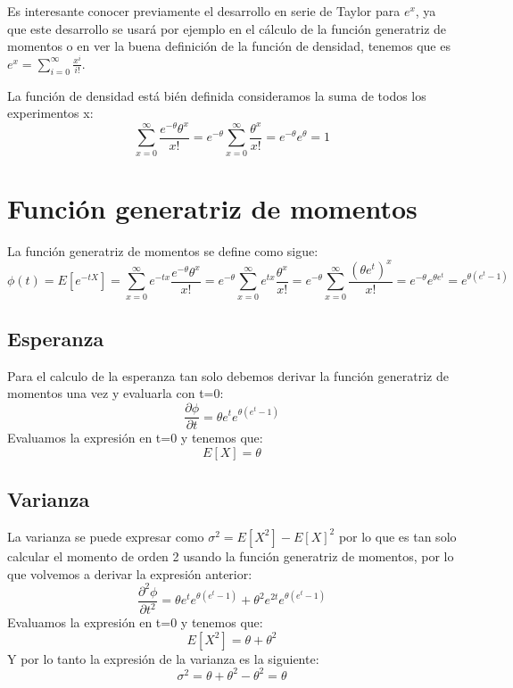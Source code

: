 \documentclass[a4paper, 10pt]{article} %
\newcounter{def}
\begin{document}
Es interesante conocer previamente el desarrollo en serie de Taylor para $e^x$, ya que este desarrollo se usará por ejemplo en el cálculo de la función generatriz de momentos o en ver la buena definición de la función de densidad, tenemos que es $e^x=\sum_{i=0}^{\infty}\frac{x^i}{i!}$.

La función de densidad está bién definida consideramos la suma de todos los experimentos x:
$$\sum_{x=0}^{\infty}\frac{e^{-\theta}\theta^x}{x!}=e^{-\theta}\sum_{x=0}^{\infty}\frac{\theta^x}{x!}=e^{-\theta}e^{\theta}=1$$
\section{Función generatriz de momentos}


La función generatriz de momentos se define como sigue:
$$\phi(t)=E[e^{-tX}]=\sum_{x=0}^{\infty}e^{-t x}\frac{e^{-\theta}\theta^x}{x!}=e^{-\theta}\sum_{x=0}^{\infty}e^{t x}\frac{\theta^x}{x!}=e^{-\theta}\sum_{x=0}^{\infty}\frac{(\theta e^t)^x}{x!}=e^{-\theta}e^{\theta e^t}=e^{\theta(e^t-1)}$$
\subsection{Esperanza}
Para el calculo de la esperanza tan solo debemos derivar la función generatriz de momentos una vez y evaluarla con t=0:
$$\frac{\partial\phi}{\partial t} = \theta e^t e^{\theta(e^t-1)}$$
Evaluamos la expresión en t=0 y tenemos que:
$$E[X]=\theta$$
\subsection{Varianza}
La varianza se puede expresar como $\sigma^2=E[X^2]-E[X]^2$ por lo que es tan solo calcular el momento de orden 2 usando la función generatriz de momentos, por lo que volvemos a derivar la expresión anterior:
$$\frac{\partial^2\phi}{\partial t^2} = \theta e^t e^{\theta(e^t-1)}+\theta^2 e^{2t} e^{\theta(e^t-1)}$$
Evaluamos la expresión en t=0 y tenemos que:
$$E[X^2]=\theta+\theta^2$$
Y por lo tanto la expresión de la varianza es la siguiente:
$$\sigma^2=\theta+\theta^2-\theta^2=\theta$$
\end{document}
